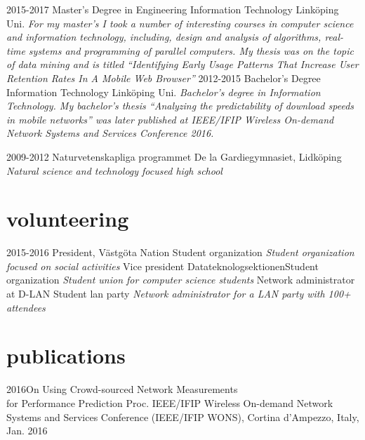 \documentclass[]{friggeri-cv}
\begin{document}
\begin{entrylist}
  \entry
    {2015-2017}
    {Master's Degree in Engineering Information Technology}
    {Linköping Uni.}
	{\emph{For my master's I took a number of interesting courses in computer science and information technology, including, design and analysis of algorithms, real-time systems and programming of parallel computers. My thesis was on the topic of data mining and is titled ``Identifying Early Usage Patterns That Increase User Retention Rates In A Mobile Web Browser''}}
  \entry
    {2012-2015}
    {Bachelor's Degree  Information Technology}
    {Linköping Uni.}
    {\emph{Bachelor's degree in Information Technology. My bachelor's thesis ``Analyzing the predictability of download speeds in mobile networks'' was later published at IEEE/IFIP Wireless On-demand Network Systems and Services Conference 2016.}}

  \entry
    {2009-2012}
    {Naturvetenskapliga programmet}
    {De la Gardiegymnasiet, Lidköping}
    {\emph{Natural science and technology focused high school}}
\end{entrylist}

 

\section{volunteering}
\begin{entrylist}
\entry
    {2015-2016}
    {President, Västgöta Nation}
    {Student organization}
    {\emph{Student organization focused on social activities}}
  {Vice president Datateknologsektionen}{Student organization}
  {\emph{Student union for computer science students}}
  {Network administrator at D-LAN}
  {Student lan party}
  {\emph{Network administrator for a LAN party with 100+ attendees}}
\end{entrylist}
	\section{publications}


	\begin{entrylist}
	\entry
	{2016}{On Using Crowd-sourced Network Measurements \\for Performance
	Prediction}{ }
	{Proc. IEEE/IFIP Wireless On-demand Network Systems and Services Conference (IEEE/IFIP WONS), Cortina d'Ampezzo, Italy, Jan. 2016}
	\end{entrylist}
\end{document}
